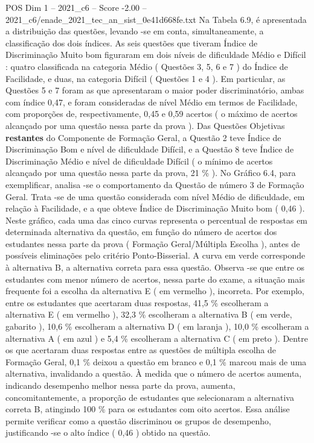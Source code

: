 \begin{textsample}{POS Dim 1 – 2021\_c6 – Score -2.00 – 2021\_c6/enade\_2021\_tec\_an\_sist\_0e41d668fe.txt}
Na Tabela 6.9, é apresentada a distribuição das questões, levando -se em conta, simultaneamente, a classificação dos dois índices.
As seis questões que tiveram Índice de Discriminação Muito bom figuraram em dois níveis de dificuldade Médio e Difícil : quatro classificada na categoria Médio ( Questões 3, 5, 6 e 7 ) do Índice de Facilidade, e duas, na categoria Difícil ( Questões 1 e 4 ).
Em particular, as Questões 5 e 7 foram as que apresentaram o maior poder discriminatório, ambas com índice 0,47, e foram consideradas de nível Médio em termos de Facilidade, com proporções de, respectivamente, 0,45 e 0,59 acertos ( o máximo de acertos alcançado por uma questão nessa parte da prova ).
Das Questões Objetivas \textbf{restantes} do Componente de Formação Geral, a Questão 2 teve Índice de Discriminação Bom e nível de dificuldade Difícil, e a Questão 8 teve Índice de Discriminação Médio e nível de dificuldade Difícil ( o mínimo de acertos alcançado por uma questão nessa parte da prova, 21 \% ).
No Gráfico 6.4, para exemplificar, analisa -se o comportamento da Questão de número 3 de Formação Geral.
Trata -se de uma questão considerada com nível Médio de dificuldade, em relação à Facilidade, e a que obteve Índice de Discriminação Muito bom ( 0,46 ).
Neste gráfico, cada uma das cinco curvas representa o percentual de respostas em determinada alternativa da questão, em função do número de acertos dos estudantes nessa parte da prova ( Formação Geral/Múltipla Escolha ), antes de possíveis eliminações pelo critério Ponto-Bisserial.
A curva em verde corresponde à alternativa B, a alternativa correta para essa questão.
Observa -se que entre os estudantes com menor número de acertos, nessa parte do exame, a situação mais frequente foi a escolha da alternativa E ( em vermelho ), incorreta.
Por exemplo, entre os estudantes que acertaram duas respostas, 41,5 \% escolheram a alternativa E ( em vermelho ), 32,3 \% escolheram a alternativa B ( em verde, gabarito ), 10,6 \% escolheram a alternativa D ( em laranja ), 10,0 \% escolheram a alternativa A ( em azul ) e 5,4 \% escolheram a alternativa C ( em preto ).
Dentre os que acertaram duas respostas entre as questões de múltipla escolha de Formação Geral, 0,1 \% deixou a questão em branco e 0,1 \% marcou mais de uma alternativa, invalidando a questão.
À medida que o número de acertos aumenta, indicando desempenho melhor nessa parte da prova, aumenta, concomitantemente, a proporção de estudantes que selecionaram a alternativa correta B, atingindo 100 \% para os estudantes com oito acertos.
Essa análise permite verificar como a questão discriminou os grupos de desempenho, justificando -se o alto índice ( 0,46 ) obtido na questão.

\end{textsample}
